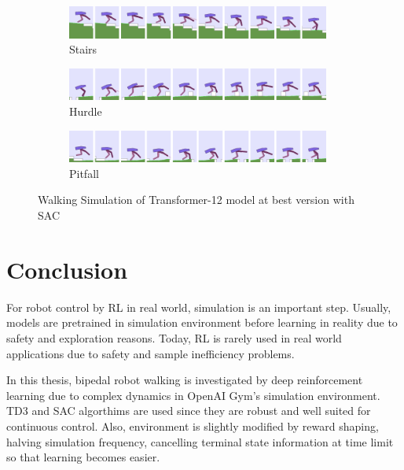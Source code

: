 \documentclass[a4paper, 12pt]{article} %
\begin{document}
\begin{figure}[!ht]
	\centering
	\begin{subfigure}{.95\textwidth}
		\centering
		\includegraphics[width=0.95\textwidth]{figures/bipedal/anim/trsf-12-stairs.png}
		\caption{Stairs}
		\label{fig:anim_trsf_stairs}
	\end{subfigure}
	\begin{subfigure}{.95\textwidth}
		\centering
		\includegraphics[width=0.95\textwidth]{figures/bipedal/anim/trsf-12-hurdle.png}
		\caption{Hurdle}
		\label{fig:anim_trsf_hurdle}
	\end{subfigure}
	\begin{subfigure}{.95\textwidth}
		\centering
		\includegraphics[width=0.95\textwidth]{figures/bipedal/anim/trsf-12-pitfall.png}
		\caption{Pitfall}
		\label{fig:anim_trsf_pitfall}
	\end{subfigure}
	\caption{Walking Simulation of Transformer-12 model at best version with SAC}
	\label{fig:trsf_simulation}
\end{figure}

\section{Conclusion}

For robot control by RL in real world, simulation is an important step. 
Usually, models are pretrained in simulation environment before learning in reality due to safety and exploration reasons. 
Today, RL is rarely used in real world applications due to safety and sample inefficiency problems. 

In this thesis, bipedal robot walking is investigated by deep  reinforcement learning due to complex dynamics in OpenAI Gym's simulation environment. 
TD3 and SAC algorthims are used since they are robust and well suited for continuous control. 
Also, environment is slightly modified by reward shaping, halving simulation frequency, cancelling terminal state information at time limit so that learning becomes easier.
\end{document}
